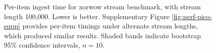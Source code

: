 \begin{figure}
\resizebox{\linewidth}{!}{%
%
}
\caption{%
Per-item ingest time for xorwow stream benchmark, with stream length 100,000.
Lower is better.
Supplementary Figure \ref{fig:perf-pico-supp} provides per-item timings under alternate stream lengths, which produced similar results.
Shaded bands indicate bootstrap 95\% confidence intervals, $n=10$.
}
\label{fig:pico-performance}
\end{figure}
